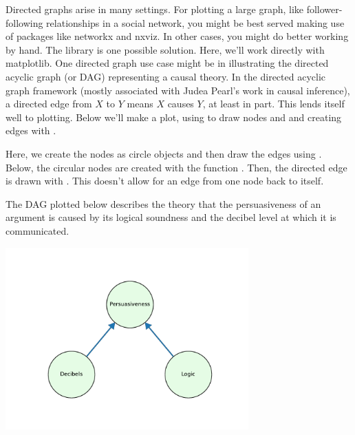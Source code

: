 Directed graphs arise in many settings. For plotting a large graph, like follower-following relationships in a social network, you might be best served making use of packages like networkx and nxviz. In other cases, you might do better working by hand. The  library is one possible solution. Here, we'll work directly with matplotlib. One directed graph use case might be in illustrating the directed acyclic graph (or DAG) representing a causal theory. In the directed acyclic graph framework (mostly associated with Judea Pearl's work in causal inference), a directed edge from $X$ to $Y$ means $X$ causes $Y$, at least in part. This lends itself well to plotting. Below we'll make a plot, using  to draw nodes and and creating edges with .

Here, we create the nodes as circle objects and then draw the edges using . Below, the circular nodes are created with the function . Then, the directed edge is drawn with . This doesn't allow for an edge from one node back to itself. 



The DAG plotted below describes the theory that the persuasiveness of an argument is caused by its logical soundness and the decibel level at which it is communicated. 


\begin{center}
    \includegraphics[width = 0.7\textwidth]{figures/poetryplots/dag-argue.pdf}
\end{center}
